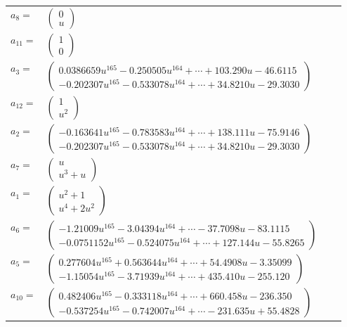 \documentclass[1p]{elsarticle_modified}
\theoremstyle{definition}
\begin{document}
\begin{tabular}{m{7pt} m{180pt} m{7pt} m{180pt} }
\flushright $a_{8}=$&$\begin{pmatrix}0\\u\end{pmatrix}$ \\
\flushright $a_{11}=$&$\begin{pmatrix}1\\0\end{pmatrix}$ \\
\flushright $a_{3}=$&$\begin{pmatrix}0.0386659 u^{165}-0.250505 u^{164}+\cdots+103.290 u-46.6115\\-0.202307 u^{165}-0.533078 u^{164}+\cdots+34.8210 u-29.3030\end{pmatrix}$ \\
\flushright $a_{12}=$&$\begin{pmatrix}1\\u^2\end{pmatrix}$ \\
\flushright $a_{2}=$&$\begin{pmatrix}-0.163641 u^{165}-0.783583 u^{164}+\cdots+138.111 u-75.9146\\-0.202307 u^{165}-0.533078 u^{164}+\cdots+34.8210 u-29.3030\end{pmatrix}$ \\
\flushright $a_{7}=$&$\begin{pmatrix}u\\u^3+u\end{pmatrix}$ \\
\flushright $a_{1}=$&$\begin{pmatrix}u^2+1\\u^4+2 u^2\end{pmatrix}$ \\
\flushright $a_{6}=$&$\begin{pmatrix}-1.21009 u^{165}-3.04394 u^{164}+\cdots-37.7098 u-83.1115\\-0.0751152 u^{165}-0.524075 u^{164}+\cdots+127.144 u-55.8265\end{pmatrix}$ \\
\flushright $a_{5}=$&$\begin{pmatrix}0.277604 u^{165}+0.563644 u^{164}+\cdots+54.4908 u-3.35099\\-1.15054 u^{165}-3.71939 u^{164}+\cdots+435.410 u-255.120\end{pmatrix}$ \\
\flushright $a_{10}=$&$\begin{pmatrix}0.482406 u^{165}-0.333118 u^{164}+\cdots+660.458 u-236.350\\-0.537254 u^{165}-0.742007 u^{164}+\cdots-231.635 u+55.4828\end{pmatrix}$ \\

\end{tabular}
\end{document}
